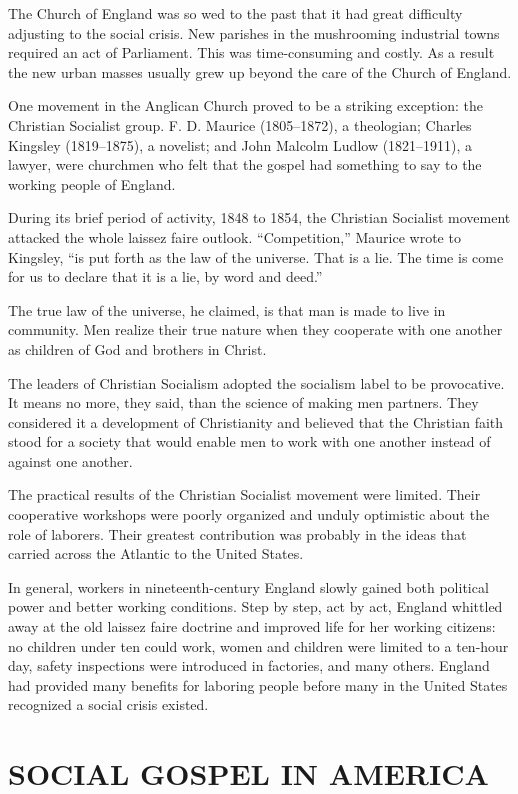 The Church of England was so wed to the past that it had great difficulty adjusting to the social
crisis. New parishes in the mushrooming industrial towns required an act of Parliament. This was
time-consuming and costly. As a result the new urban masses usually grew up beyond the care of the
Church of England.

One movement in the Anglican Church proved to be a striking exception: the Christian Socialist
group. F. D. Maurice (1805–1872), a theologian; Charles Kingsley (1819–1875), a novelist; and John
Malcolm Ludlow (1821–1911), a lawyer, were churchmen who felt that the gospel had something to say
to the working people of England.

During its brief period of activity, 1848 to 1854, the Christian Socialist movement attacked the
whole laissez faire outlook. “Competition,” Maurice wrote to Kingsley, “is put forth as the law of
the universe. That is a lie. The time is come for us to declare that it is a lie, by word and deed.”

The true law of the universe, he claimed, is that man is made to live in community. Men realize
their true nature when they cooperate with one another as children of God and brothers in Christ.

The leaders of Christian Socialism adopted the socialism label to be provocative. It means no more,
they said, than the science of making men partners. They considered it a development of Christianity
and believed that the Christian faith stood for a society that would enable men to work with one
another instead of against one another.

The practical results of the Christian Socialist movement were limited. Their cooperative workshops
were poorly organized and unduly optimistic about the role of laborers. Their greatest contribution
was probably in the ideas that carried across the Atlantic to the United States.

In general, workers in nineteenth-century England slowly gained both political power and better
working conditions. Step by step, act by act, England whittled away at the old laissez faire
doctrine and improved life for her working citizens: no children under ten could work, women and
children were limited to a ten-hour day, safety inspections were introduced in factories, and many
others. England had provided many benefits for laboring people before many in the United States
recognized a social crisis existed.

\section{SOCIAL GOSPEL IN AMERICA}

